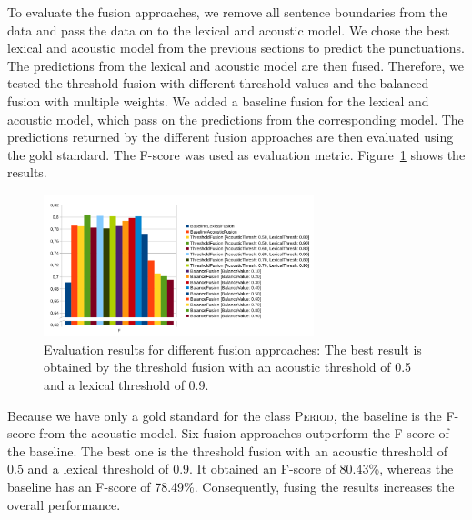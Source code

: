 To evaluate the fusion approaches, we remove all sentence boundaries from the data and pass the data on to the lexical and acoustic model.
We chose the best lexical and acoustic model from the previous sections to predict the punctuations.
The predictions from the lexical and acoustic model are then fused.
Therefore, we tested the threshold fusion with different threshold values and the balanced fusion with multiple weights.
We added a baseline fusion for the lexical and acoustic model, which pass on the predictions from the corresponding model.
The predictions returned by the different fusion approaches are then evaluated using the gold standard.
The F-score was used as evaluation metric.
Figure~\ref{fig:eval_fusion} shows the results.
\begin{figure}[ht]
    \centering
    \includegraphics[width=0.7\textwidth]{img/fusion_eval.pdf}
    \caption{Evaluation results for different fusion approaches: The best result is obtained by the threshold fusion with an acoustic threshold of 0.5 and a lexical threshold of 0.9.}
    \label{fig:eval_fusion}
\end{figure}

Because we have only a gold standard for the class \textsc{Period}, the baseline is the F-score from the acoustic model.
Six fusion approaches outperform the F-score of the baseline.
The best one is the threshold fusion with an acoustic threshold of 0.5 and a lexical threshold of 0.9.
It obtained an F-score of 80.43\%, whereas the baseline has an F-score of 78.49\%.
Consequently, fusing the results increases the overall performance.
